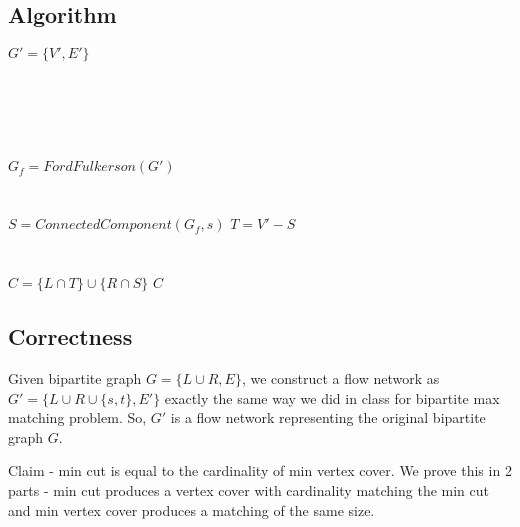 \documentclass{article}
\begin{document}
    \subsection*{Algorithm}
        \begin{algorithm}[H]
            \begin{algorithmic}
                    \State $G' = \{V', E'\}$ \\
                     \\
                     \\
                     \\
                     \\ \\

                    \State $G_f = FordFulkerson(G')$ \\
                     \\ \\

                    \State $S = ConnectedComponent(G_f, s)$
                    \State $T = V' - S$ \\
                     \\ \\

                    \State $C = \{L \cap T\} \cup \{R \cap S\}$
                    \State \Return $C$
                \EndProcedure
            \end{algorithmic}
        \end{algorithm}

    \subsection*{Correctness}
    Given bipartite graph $G = \{L \cup R, E\}$, we construct a flow network as $G' = \{L \cup R \cup \{s, t\}, E'\}$ exactly the same way we did in class for bipartite max matching problem. So, $G'$ is a flow network representing the original bipartite graph $G$.

    Claim - min cut is equal to the cardinality of min vertex cover. We prove this in 2 parts - min cut produces a vertex cover with cardinality matching the min cut and min vertex cover produces a matching of the same size.
\end{document}

